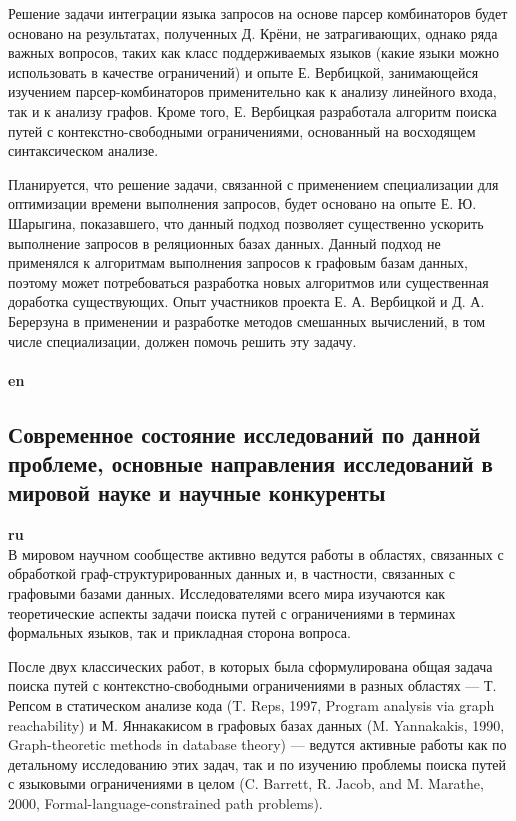 \documentclass[12pt]{article}  %
\theoremstyle{remark}
\begin{document}
Решение задачи интеграции языка запросов на основе парсер комбинаторов будет основано на результатах, полученных Д. Крёни, не затрагивающих, однако ряда важных вопросов, таких как класс поддерживаемых языков (какие языки можно использовать в качестве ограничений) и опыте Е. Вербицкой, занимающейся изучением парсер-комбинаторов применительно как к анализу линейного входа, так и к анализу графов.
Кроме того, Е. Вербицкая разработала алгоритм поиска путей с контекстно-свободными ограничениями, основанный на восходящем синтаксическом анализе.

Планируется, что решение задачи, связанной с применением специализации для оптимизации времени выполнения запросов, будет основано на опыте Е. Ю. Шарыгина, показавшего, что данный подход позволяет существенно ускорить выполнение запросов в реляционных базах данных. Данный подход не применялся к алгоритмам выполнения запросов к графовым базам данных, поэтому может потребоваться разработка новых алгоритмов или существенная доработка существующих. Опыт участников проекта Е. А. Вербицкой и Д. А. Берерзуна в применении и разработке методов смешанных вычислений, в том числе специализации, должен помочь решить эту задачу.
\\
\\
\textbf{en}\\

\subsection{Современное состояние исследований по данной проблеме, основные направления исследований в мировой науке и научные конкуренты}

\textbf{ru}\\
%
В мировом научном сообществе активно ведутся работы в областях, связанных с обработкой граф-структурированных данных и, в частности, связанных с графовыми базами данных. Исследователями всего мира изучаются как теоретические аспекты задачи поиска путей с ограничениями в терминах формальных языков, так и прикладная сторона вопроса.

После двух классических работ, в которых была сформулирована общая задача поиска путей с контекстно-свободными ограничениями в разных областях --- Т. Репсом в статическом анализе кода (T. Reps, 1997, Program analysis via graph reachability) и М. Яннакакисом в графовых базах данных (M. Yannakakis, 1990, Graph-theoretic methods in database theory) --- ведутся активные работы как по детальному исследованию этих задач, так и по изучению проблемы поиска путей с языковыми ограничениями в целом (C. Barrett, R. Jacob, and M. Marathe, 2000, Formal-language-constrained path problems).
\end{document}
